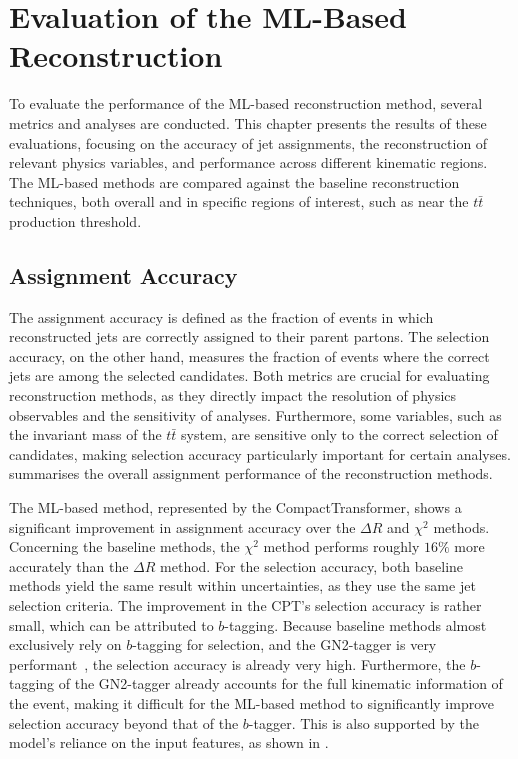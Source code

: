 \chapter{Evaluation of the ML-Based Reconstruction}
\label{chap:performance-evaluation}
To evaluate the performance of the ML-based reconstruction method, several metrics and analyses are conducted. This chapter presents the results of these evaluations, focusing on the accuracy of jet assignments, the reconstruction of relevant physics variables, and performance across different kinematic regions. The ML-based methods are compared against the baseline reconstruction techniques, both overall and in specific regions of interest, such as near the $t\bar{t}$ production threshold.

\section{Assignment Accuracy}
\label{sec:evaluation:assignment}
The assignment accuracy is defined as the fraction of events in which reconstructed jets are correctly assigned to their parent partons. The selection accuracy, on the other hand, measures the fraction of events where the correct jets are among the selected candidates. Both metrics are crucial for evaluating reconstruction methods, as they directly impact the resolution of physics observables and the sensitivity of analyses. Furthermore, some variables, such as the invariant mass of the $t\bar{t}$ system, are sensitive only to the correct selection of candidates, making selection accuracy particularly important for certain analyses.  summarises the overall assignment performance of the reconstruction methods.

\begin{table}[ht]
    \centering
    \caption{Comparison of assignment and selection accuracies for         different reconstruction methods. The uncertainties represent the     statistical variations in the evaluation dataset.}
    
    \label{tab:reconstruction-accuracies}
\end{table}

The ML-based method, represented by the CompactTransformer, shows a significant improvement in assignment accuracy over the $\Delta R$ and $\chi^2$ methods. Concerning the baseline methods, the $\chi^2$ method performs roughly $16\%$ more accurately than the $\Delta R$ method. For the selection accuracy, both baseline methods yield the same result within uncertainties, as they use the same jet selection criteria. The improvement in the CPT's selection accuracy is rather small, which can be attributed to $b$-tagging. Because baseline methods almost exclusively rely on $b$-tagging for selection, and the GN2-tagger is very performant~\cite{gn2_btagger}, the selection accuracy is already very high. Furthermore, the $b$-tagging of the GN2-tagger already accounts for the full kinematic information of the event, making it difficult for the ML-based method to significantly improve selection accuracy beyond that of the $b$-tagger. This is also supported by the model's reliance on the input features, as shown in . 

